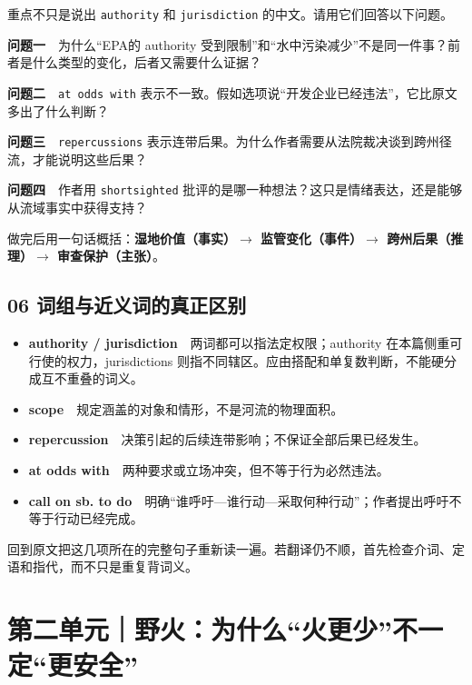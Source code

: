 \documentclass[a4paper,11pt,openany]{report}
\renewenvironment{quote}{%
 \par\begin{list}{}{\setlength{\leftmargin}{1.25em}\setlength{\rightmargin}{0em}}\item[]\color{bodygrey}\ignorespaces
}{\end{list}}
\providecommand{\tightlist}{\setlength{\itemsep}{1pt}\setlength{\parskip}{0pt}}
\begin{document}
重点不只是说出 \texttt{authority} 和 \texttt{jurisdiction} 的中文。请用它们回答以下问题。

\textbf{问题一}　为什么``EPA的 authority 受到限制''和``水中污染减少''不是同一件事？前者是什么类型的变化，后者又需要什么证据？

\textbf{问题二}　\texttt{at\ odds\ with} 表示不一致。假如选项说``开发企业已经违法''，它比原文多出了什么判断？

\textbf{问题三}　\texttt{repercussions} 表示连带后果。为什么作者需要从法院裁决谈到跨州径流，才能说明这些后果？

\textbf{问题四}　作者用 \texttt{shortsighted} 批评的是哪一种想法？这只是情绪表达，还是能够从流域事实中获得支持？

\begin{quote}
做完后用一句话概括：\textbf{湿地价值（事实）\(\rightarrow\) 监管变化（事件）\(\rightarrow\) 跨州后果（推理）\(\rightarrow\) 审查保护（主张）}。
\end{quote}

\section{06 词组与近义词的真正区别}\label{ux8bcdux7ec4ux4e0eux8fd1ux4e49ux8bcdux7684ux771fux6b63ux533aux522b}

\begin{itemize}
\tightlist
\item
  \textbf{authority / jurisdiction}　两词都可以指法定权限；authority 在本篇侧重可行使的权力，jurisdictions 则指不同辖区。应由搭配和单复数判断，不能硬分成互不重叠的词义。
\item
  \textbf{scope}　规定涵盖的对象和情形，不是河流的物理面积。
\item
  \textbf{repercussion}　决策引起的后续连带影响；不保证全部后果已经发生。
\item
  \textbf{at odds with}　两种要求或立场冲突，但不等于行为必然违法。
\item
  \textbf{call on sb. to do}　明确``谁呼吁---谁行动---采取何种行动''；作者提出呼吁不等于行动已经完成。
\end{itemize}

回到原文把这几项所在的完整句子重新读一遍。若翻译仍不顺，首先检查介词、定语和指代，而不只是重复背词义。

\chapter{第二单元｜野火：为什么``火更少''不一定``更安全''}\label{ux7b2cux4e8cux5355ux5143ux91ceux706bux4e3aux4ec0ux4e48ux706bux66f4ux5c11ux4e0dux4e00ux5b9aux66f4ux5b89ux5168}
\end{document}

